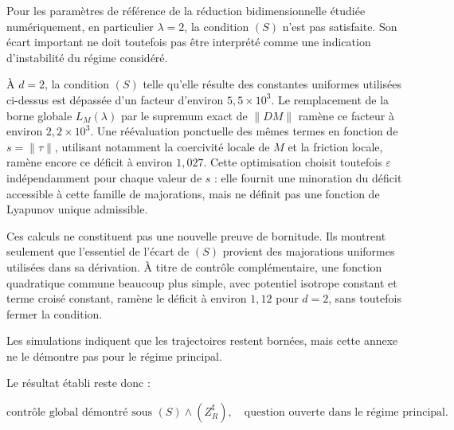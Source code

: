 Pour les paramètres de référence de la réduction bidimensionnelle étudiée numériquement, en particulier \(\lambda=2\), la condition \((S)\) n'est pas satisfaite. Son écart important ne doit toutefois pas être interprété comme une indication d'instabilité du régime considéré.

À \(d=2\), la condition \((S)\) telle qu'elle résulte des constantes uniformes utilisées ci-dessus est dépassée d'un facteur d'environ \(5{,}5\times10^3\). Le remplacement de la borne globale \(L_M(\lambda)\) par le supremum exact de \(\|DM\|\) ramène ce facteur à environ \(2{,}2\times10^3\). Une réévaluation ponctuelle des mêmes termes en fonction de \(s=\|\tau\|\), utilisant notamment la coercivité locale de \(M\) et la friction locale, ramène encore ce déficit à environ \(1{,}027\). Cette optimisation choisit toutefois \(\varepsilon\) indépendamment pour chaque valeur de \(s\) : elle fournit une minoration du déficit accessible à cette famille de majorations, mais ne définit pas une fonction de Lyapunov unique admissible.

Ces calculs ne constituent pas une nouvelle preuve de bornitude. Ils montrent seulement que l'essentiel de l'écart de \((S)\) provient des majorations uniformes utilisées dans sa dérivation. À titre de contrôle complémentaire, une fonction quadratique commune beaucoup plus simple, avec potentiel isotrope constant et terme croisé constant, ramène le déficit à environ \(1{,}12\) pour \(d=2\), sans toutefois fermer la condition.

Les simulations indiquent que les trajectoires restent bornées, mais cette annexe ne le démontre pas pour le régime principal.

Le résultat établi reste donc :

$$
\boxed{
\text{contrôle global démontré sous }(S)\land(Z_R^\sharp),
\quad
\text{question ouverte dans le régime principal}.
}
$$

